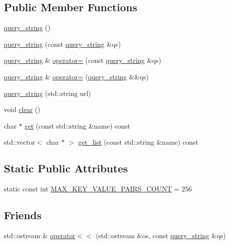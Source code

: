 \subsection*{Public Member Functions}
\begin{DoxyCompactItemize}
\item 
\hyperlink{classcrow_1_1query__string_aa1d5497d54799e733c393d9e554aed93}{query\-\_\-string} ()
\item 
\hyperlink{classcrow_1_1query__string_a37aa44f47830f12290364cc0afd94ad2}{query\-\_\-string} (const \hyperlink{classcrow_1_1query__string}{query\-\_\-string} \&qs)
\item 
\hyperlink{classcrow_1_1query__string}{query\-\_\-string} \& \hyperlink{classcrow_1_1query__string_a649427bd73c23963eaa29dc230a5cde0}{operator=} (const \hyperlink{classcrow_1_1query__string}{query\-\_\-string} \&qs)
\item 
\hyperlink{classcrow_1_1query__string}{query\-\_\-string} \& \hyperlink{classcrow_1_1query__string_ab1be7ad7a7d36dc348c2481f7d91d2ab}{operator=} (\hyperlink{classcrow_1_1query__string}{query\-\_\-string} \&\&qs)
\item 
\hyperlink{classcrow_1_1query__string_a2faa001bd5e43160c0be0f0b64f5ac53}{query\-\_\-string} (std\-::string url)
\item 
void \hyperlink{classcrow_1_1query__string_a19138a2e29bba49996bf67e7403da405}{clear} ()
\item 
char $\ast$ \hyperlink{classcrow_1_1query__string_aeca9afc8029e0973cb99e2a5f368dff7}{get} (const std\-::string \&name) const 
\item 
std\-::vector$<$ char $\ast$ $>$ \hyperlink{classcrow_1_1query__string_ab6baa4c21cb0263f7cd03305d3f52c3f}{get\-\_\-list} (const std\-::string \&name) const 
\end{DoxyCompactItemize}
\subsection*{Static Public Attributes}
\begin{DoxyCompactItemize}
\item 
static const int \hyperlink{classcrow_1_1query__string_a662f25d9fb17d06acac49f0f09973193}{M\-A\-X\-\_\-\-K\-E\-Y\-\_\-\-V\-A\-L\-U\-E\-\_\-\-P\-A\-I\-R\-S\-\_\-\-C\-O\-U\-N\-T} = 256
\end{DoxyCompactItemize}
\subsection*{Friends}
\begin{DoxyCompactItemize}
\item 
std\-::ostream \& \hyperlink{classcrow_1_1query__string_a43f85a8b06660b61cd05226504559768}{operator$<$$<$} (std\-::ostream \&os, const \hyperlink{classcrow_1_1query__string}{query\-\_\-string} \&qs)
\end{DoxyCompactItemize}


